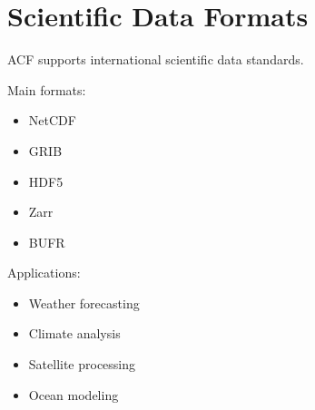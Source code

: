 \section{Scientific Data Formats}


ACF supports international scientific data standards.



Main formats:


\begin{itemize}

\item NetCDF

\item GRIB

\item HDF5

\item Zarr

\item BUFR

\end{itemize}



Applications:


\begin{itemize}

\item Weather forecasting

\item Climate analysis

\item Satellite processing

\item Ocean modeling

\end{itemize}
